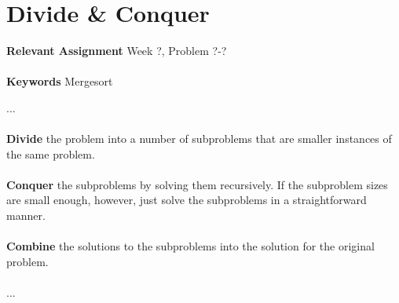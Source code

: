 
\chapter{Divide \& Conquer}
\label{ch:divideandconquer}

\textbf{Relevant Assignment} Week ?, Problem ?-?\\\\
\textbf{Keywords} Mergesort
\vspace{1in}

\noindent ...
\\\\
\noindent \textbf{Divide} the problem into a number of subproblems that are
smaller instances of the same problem.
\\\\
\noindent \textbf{Conquer} the subproblems by solving them recursively. If the
subproblem sizes are small enough, however, just solve the subproblems in a
straightforward manner.
\\\\
\noindent \textbf{Combine} the solutions to the subproblems into the solution
for the original problem.
\\\\
...

